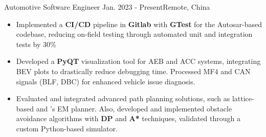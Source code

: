\resumeSubheadingReza
{Automotive Software Engineer}{}
{Jan. 2023 - Present}{Remote, China}
{
  \vspace{-12pt}
  \begin{itemize}
    \item {Implemented a \textbf{CI/CD} pipeline in \textbf{Gitlab} with \textbf{GTest} for the Autosar-based codebase, reducing on-field testing through automated unit and integration tests by 30\%}
    \item {Developed a \textbf{PyQT} visualization tool for AEB and ACC systems, integrating BEV plots to drastically reduce debugging time. Processed MF4 and CAN signals (BLF, DBC) for enhanced vehicle issue diagnosis.}
    \item {Evaluated and integrated advanced path planning solutions, such as lattice-based and 's EM planner. Also, developed and implemented obstacle avoidance algorithms with \textbf{DP} and \textbf{A*} techniques, validated through a custom Python-based simulator.}
  \end{itemize}
}




